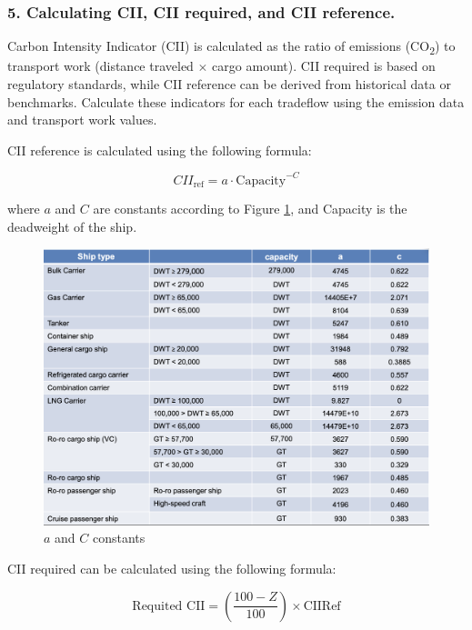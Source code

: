 \subsubsection{5. Calculating CII, CII required, and CII reference.}

Carbon Intensity Indicator (CII) is calculated as the ratio of emissions (CO\textsubscript{2}) to transport work (distance traveled $\times$ cargo amount). CII required is based on regulatory standards, while CII reference can be derived from historical data or benchmarks. Calculate these indicators for each tradeflow using the emission data and transport work values.

CII reference is calculated using the following formula:

\begin{equation}
    CII_{\text{ref}} = a \cdot \text{Capacity}^{-C}
\end{equation}

where $a$ and $C$ are constants according to Figure \ref{cii_ref_constant}, and Capacity is the deadweight of the ship.

\begin{figure}[h]
    \centering
    \includegraphics[width=1\textwidth]{images/cii_ref_constant.png}
    \caption{$a$ and $C$ constants}
    \label{cii_ref_constant}
\end{figure}

CII required can be calculated using the following formula:

\begin{equation}
    \text{Requited CII} = \left( \frac{100 -Z}{100}\right) \times \text{CIIRef}
    \label{cii_required}
\end{equation}

